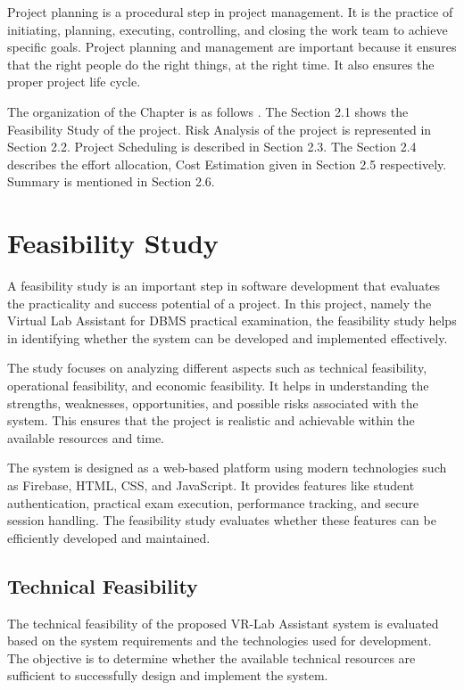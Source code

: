 
\justifying 
Project planning is a procedural step in project management. It is the practice of initiating,
planning, executing, controlling, and closing the work team to achieve specific goals. Project
planning and management are important because it ensures that the right people do the right
things, at the right time. It also ensures the proper project life cycle.

The organization of the Chapter is as follows . The Section 2.1 shows the Feasibility
Study of the project. Risk Analysis of the project is represented in Section 2.2. Project
Scheduling is described in Section 2.3. The Section 2.4  describes the effort allocation, Cost Estimation given in Section 2.5 respectively. Summary is mentioned in Section 2.6.


\section{Feasibility Study}

A feasibility study is an important step in software development that evaluates the practicality and success potential of a project. In this project, namely the Virtual Lab Assistant for DBMS practical examination, the feasibility study helps in identifying whether the system can be developed and implemented effectively.

The study focuses on analyzing different aspects such as technical feasibility, operational feasibility, and economic feasibility. It helps in understanding the strengths, weaknesses, opportunities, and possible risks associated with the system. This ensures that the project is realistic and achievable within the available resources and time.

The system is designed as a web-based platform using modern technologies such as Firebase, HTML, CSS, and JavaScript. It provides features like student authentication, practical exam execution, performance tracking, and secure session handling. The feasibility study evaluates whether these features can be efficiently developed and maintained.



\subsection{Technical Feasibility}
The technical feasibility of the proposed VR-Lab Assistant system is evaluated based on the system requirements and the technologies used for development. The objective is to determine whether the available technical resources are sufficient to successfully design and implement the system.

